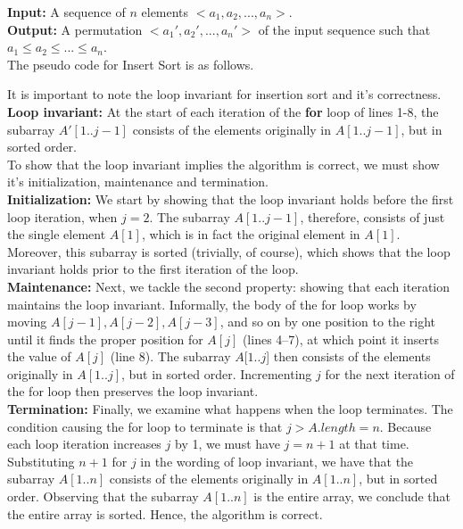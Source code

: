 \documentclass[12pt]{article}
\begin{document}
\textbf{Input:} A sequence of $n$ elements $<a_1, a_2, ..., a_n>$.\\

\textbf{Output:} A permutation $<a_1', a_2', ..., a_n'>$ of the input sequence such that \\
\indent $a_1 \le a_2 \le ... \le a_n$.\\

The pseudo code for Insert Sort is as follows.



It is important to note the loop invariant for insertion sort and it's correctness. \\

\textbf{Loop invariant:}  At the start of each iteration of the \textbf{for} loop of lines 1-8, the subarray $A'[1 .. j-1]$ consists of the elements originally in $A[1 .. j-1]$, but in  sorted order.\\

To show that the loop invariant implies the algorithm is correct, we must show it's initialization, maintenance and termination. \\

\textbf{Initialization: } We start by showing that the loop invariant holds before the first loop iteration, when $j = 2$. The subarray $A[1..j - 1]$, therefore, consists of just the single element $A[1]$, which is in fact the original element in $A[1]$. Moreover, this subarray is sorted (trivially, of course), which shows that the loop invariant holds prior to the first iteration of the loop.\\

\textbf{Maintenance: } Next, we tackle the second property: showing that each iteration maintains the loop invariant. Informally, the body of the for loop works by moving $A[j-1], A[j-2], A[j-3]$, and so on by one position to the right until it finds the proper position for $A[j]$ (lines 4–7), at which point it inserts the value of $A[j]$ (line 8). The subarray $A[1..j$] then consists of the elements originally in $A[1..j]$, but in sorted order. Incrementing $j$ for the next iteration of the for loop then preserves the loop invariant.\\

\textbf{Termination:} Finally, we examine what happens when the loop terminates. The condition causing the for loop to terminate is that $ j  > A.length = n$. Because each loop iteration increases $j$ by 1, we must have $j = n + 1$ at that time. Substituting $n + 1$ for $j$ in the wording of loop invariant, we have that the subarray $A[1..n]$ consists of the elements originally in $A[1..n]$, but in sorted order. Observing that the subarray $A[1..n]$ is the entire array, we conclude that the entire array is sorted. Hence, the algorithm is correct.\\
\end{document}
